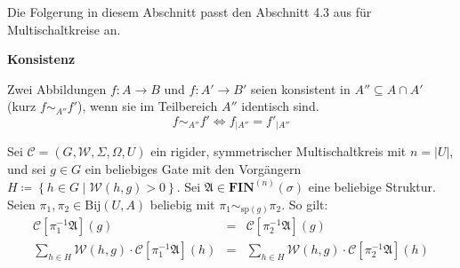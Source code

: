 Die Folgerung in diesem Abschnitt passt den Abschnitt 4.3 aus \cite{AD2014}
für Multischaltkreise an.
\begin{defn}
\textbf{Konsistenz}

Zwei Abbildungen $f:A\rightarrow B$ und $f:A'\rightarrow B'$ seien
konsistent in $A''\subseteq A\cap A'$ (kurz $f\sim_{A''}f'$), wenn
sie im Teilbereich $A''$ identisch sind. 
\[
f\sim_{A''}f'\Leftrightarrow f_{\mid A''}=f'_{\mid A''}
\]
\end{defn}
\begin{prop}
\label{prop:konsistenz}Sei $\mathcal{C}=\left(G,\mathcal{W},\Sigma,\Omega,U\right)$
ein rigider, symmetrischer Multischaltkreis mit $n=\left|U\right|$,
und sei $g\in G$ ein beliebiges Gate mit den Vorgängern $H\coloneqq\left\{ h\in G\mid\mathcal{W}\left(h,g\right)>0\right\} $.
Sei $\mathfrak{A}\in\mathbf{FIN}^{\left(n\right)}\left(\sigma\right)$
eine beliebige Struktur. Seien $\pi_{1},\pi_{2}\in\mathrm{Bij}\left(U,A\right)$
beliebig mit $\pi_{1}\sim_{\mathrm{sp}\left(g\right)}\pi_{2}$. So
gilt:
\begin{eqnarray}
\mathcal{C}\left[\pi_{1}^{-1}\mathfrak{A}\right]\left(g\right) & = & \mathcal{C}\left[\pi_{2}^{-1}\mathfrak{A}\right]\left(g\right)\label{eq:cons-1}\\
\sum_{h\in H}\mathcal{W}\left(h,g\right)\cdot\mathcal{C}\left[\pi_{1}^{-1}\mathfrak{A}\right]\left(h\right) & = & \sum_{h\in H}\mathcal{W}\left(h,g\right)\cdot\mathcal{C}\left[\pi_{2}^{-1}\mathfrak{A}\right]\left(h\right)\label{eq:cons-2}
\end{eqnarray}
\end{prop}
